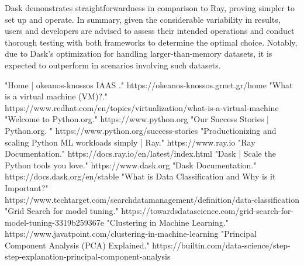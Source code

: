 \documentclass[conference]{IEEEtran}
\begin{document}
Dask demonstrates straightforwardness in comparison to Ray, proving simpler to set up and operate. In summary, given the considerable variability in results, users and developers are advised to assess their intended operations and conduct thorough testing with both frameworks to determine the optimal choice. Notably, due to Dask's optimization for handling larger-than-memory datasets, it is expected to outperform in scenarios involving such datasets.
\begin{thebibliography}{00}
 "Home | okeanos-knossos IAAS ." https://okeanos-knossos.grnet.gr/home
 "What is a virtual machine (VM)?." https://www.redhat.com/en/topics/virtualization/what-is-a-virtual-machine
 "Welcome to Python.org." https://www.python.org
 "Our Success Stories | Python.org. " https://www.python.org/success-stories
 "Productionizing and scaling Python ML workloads simply | Ray." https://www.ray.io
 "Ray Documentation." https://docs.ray.io/en/latest/index.html
 "Dask | Scale the Python tools you love." https://www.dask.org
 "Dask Documentation." https://docs.dask.org/en/stable
 "What is Data Classification and Why is it Important?" https://www.techtarget.com/searchdatamanagement/definition/data-classification
 "Grid Search for model tuning." https://towardsdatascience.com/grid-search-for-model-tuning-3319b259367e
 "Clustering in Machine Learning." https://www.javatpoint.com/clustering-in-machine-learning
 "Principal Component Analysis (PCA) Explained." https://builtin.com/data-science/step-step-explanation-principal-component-analysis
\end{thebibliography}
\end{document}
